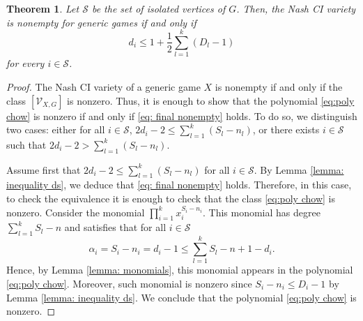 \documentclass[11pt]{amsart}
\numberwithin{equation}{section}
\theoremstyle{plain}
\newtheorem{theorem}{Theorem}
\numberwithin{theorem}{section}
\theoremstyle{definition}
\newcommand{\Vc}{{\mathcal V}_{X,G}}
\begin{document}
\begin{theorem}\label{theo:emptyness}
    Let $\mathcal S$ be the set of isolated vertices of $G$. Then, the Nash CI variety is nonempty for generic games if and only if
    \begin{equation}\label{eq: final nonempty}
    d_i\leq1+\frac12 \sum_{l=1}^k(D_l-1)
    \end{equation}
    for every $i\in\mathcal S$.
\end{theorem}
\begin{proof}
The Nash CI variety of a generic game $X$ is nonempty if and only if the class $\left[ \Vc\right]$ is nonzero. Thus, it is enough to show that the polynomial \eqref{eq:poly chow} is nonzero if and only if \eqref{eq: final nonempty} holds.
    To do so, we distinguish two cases: either  for all $ i\in\mathcal S$, $2d_i-2\leq \sum_{l=1}^k(S_l-n_l)$, or there exists $ i\in\mathcal S$ such that $2d_i-2>\sum_{l=1}^k(S_l-n_l)$.


Assume first that $2d_i-2\leq \sum_{l=1}^k(S_l-n_l)$ for all $i\in\mathcal S$. By Lemma \ref{lemma: inequality ds},  we deduce that \eqref{eq: final nonempty} holds. Therefore, in this case, to check the equivalence it is enough to check that the class \eqref{eq:poly chow} is nonzero.
Consider the monomial $\prod_{i=1}^kx_i^{S_i-n_i}$. This monomial has degree $\sum_{l=1}^k S_l-n$ and satisfies that for all $i\in\mathcal S$  $$\alpha_i=S_i-n_i=d_i-1\leq \sum_{l=1}^kS_l -n+1-d_i.$$ 
    Hence, by Lemma \ref{lemma: monomials}, this monomial appears in the polynomial \eqref{eq:poly chow}. Moreover,  such monomial is nonzero since $S_i-n_i\le D_i-1$ by Lemma \ref{lemma: inequality ds}. We conclude that the polynomial \eqref{eq:poly chow} is nonzero.



\end{proof}
\end{document}
